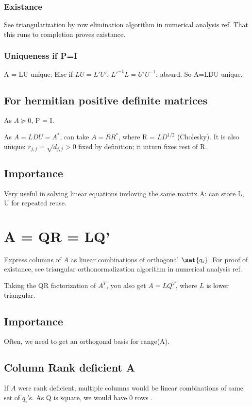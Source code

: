 \documentclass[oneside, article]{memoir}
\begin{document}
\subsubsection{Existance}
See triangularization by row elimination algorithm in numerical analysis ref. That this runs to completion proves existance.

\subsubsection{Uniqueness if P=I}
A = LU unique: Else if $LU = L'U'$, $L'^{-1}L = U'U^{-1}$: absurd. So A=LDU unique.

\subsection{For hermitian positive definite matrices}
As $A \succeq 0$, P = I.

As $A = LDU = A^{*}$, can take $A = RR^{*}$, where R = $LD^{1/2}$ (Cholesky). It is also unique: $r_{j,j} = \sqrt{d_{j,j}} >0$ fixed by definition; it inturn fixes rest of R.

\subsection{Importance}
Very useful in solving linear equations invloving the same matrix A: can store L, U for repeated reuse.


\section{A = QR = LQ'}
Express columns of $A$ as linear combinations of orthogonal $\set{q_i}$. For proof of existance, see triangular orthonormalization algorithm in numerical analysis ref.

Taking the QR factorization of $A^{T}$, you also get $A = LQ^{T}$, where $L$ is lower triangular.

\subsection{Importance}
Often, we need to get an orthogonal basis for range(A).

\subsection{Column Rank deficient A}
If $A$ were rank deficient, multiple columns would be linear combinations of same set of $q_i$'s.  As Q is square, we would have 0 rows .
\end{document}
